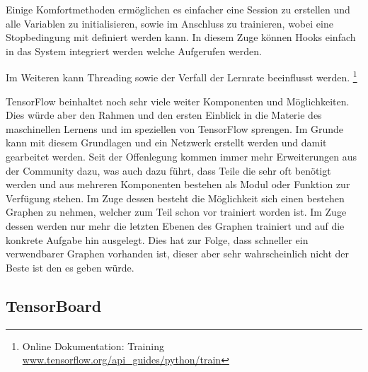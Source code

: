 \noindent
Einige Komfortmethoden ermöglichen es einfacher eine Session zu erstellen und alle Variablen zu initialisieren, sowie im Anschluss zu trainieren, wobei eine Stopbedingung mit definiert werden kann.
In diesem Zuge können Hooks einfach in das System integriert werden welche Aufgerufen werden.

\noindent
Im Weiteren kann Threading sowie der Verfall der Lernrate beeinflusst werden.
\footnote{Online Dokumentation: Training \url{www.tensorflow.org/api_guides/python/train}}



TensorFlow beinhaltet noch sehr viele weiter Komponenten und Möglichkeiten. 
Dies würde aber den Rahmen und den ersten Einblick in die Materie des maschinellen Lernens und im speziellen von TensorFlow sprengen. 
Im Grunde kann mit diesem Grundlagen und ein Netzwerk erstellt werden und damit gearbeitet werden. 
Seit der Offenlegung kommen immer mehr Erweiterungen aus der Community dazu, was auch dazu führt, dass Teile die sehr oft benötigt werden und aus mehreren Komponenten bestehen als Modul oder Funktion zur Verfügung stehen. 
Im Zuge dessen besteht die Möglichkeit sich einen bestehen Graphen zu nehmen, welcher zum Teil schon vor trainiert worden ist. 
Im Zuge dessen werden nur mehr die letzten Ebenen des Graphen trainiert und auf die konkrete Aufgabe hin ausgelegt. 
Dies hat zur Folge, dass schneller ein verwendbarer Graphen vorhanden ist, dieser aber sehr wahrscheinlich nicht der Beste ist den es geben würde. 

\subsection{TensorBoard}

